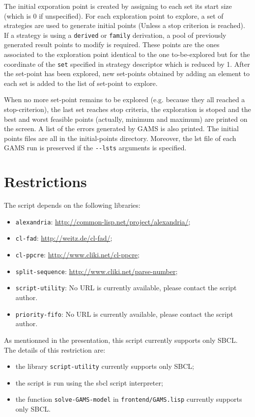 The initial exporation point is created by assigning to each set its start size
(which is 0 if unspecified). For each exploration point to explore, a set of
strategies are used to generate initial points (Unless a stop criterion is
reached). If a strategy is using a \texttt{derived} or \texttt{family}
derivation, a pool of previously generated result points to modify is
required. These points are the ones associated to the exploration point
identical to the one to-be-explored but for the coordinate of the \texttt{set}
specified in strategy descriptor which is reduced by 1.  After the set-point has
been explored, new set-points obtained by adding an element to each set is added
to the list of set-point to explore.

When no more set-point remains to be explored (e.g. because they all reached a
stop-criterion), the last set reaches stop criteria, the exploration is stoped
and the best and worst feasible points (actually, minimum and maximum) are
printed on the screen. A list of the errors generated by GAMS is also
printed. The initial points files are all in the initial-points
directory. Moreover, the lst file of each GAMS run is preserved if the
\texttt{-{}-lsts} arguments is specified.

\section*{Restrictions}

The script depends on the following libraries:
\begin{itemize}
\item \texttt{alexandria}: \url{http://common-lisp.net/project/alexandria/};
\item \texttt{cl-fad}: \url{http://weitz.de/cl-fad/};
\item \texttt{cl-ppcre}: \url{http://www.cliki.net/cl-ppcre};
\item \texttt{split-sequence}: \url{http://www.cliki.net/parse-number};
\item \texttt{script-utility}: No URL is currently available, please contact the
  script author.
\item \texttt{priority-fifo}: No URL is currently available, please contact the
  script author.
\end{itemize}

As mentionned in the presentation, this script currently supports only SBCL.
The details of this restriction are:
\begin{itemize}
\item the library \texttt{script-utility} currently supports only SBCL;
\item the script is run using the sbcl script interpreter;
\item the function \texttt{solve-GAMS-model} in \texttt{frontend/GAMS.lisp}
  currently supports only SBCL.
\end{itemize}
